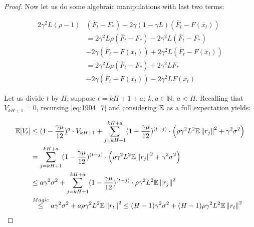 \begin{proof}
    Now let us do some algebraic manipulations with last two terms:

    \begin{align}
        2 \gamma^2 L (\rho - 1) & (\bar{F}_t - F_*)
        - 2\gamma (1-\gamma L) (\bar{F}_t - F(\bar{x}_t)) \\
        &=
        2 \gamma^2 L \rho (\bar{F}_t - F_*)
        - 2 \gamma^2 L (\bar{F}_t - F_*) \\
        &- 2\gamma (\bar{F}_t - F(\bar{x}_t))
        + 2\gamma^2 L (\bar{F}_t - F(\bar{x}_t)) \\
        &=
        2 \gamma^2 L \rho (\bar{F}_t - F_*)
        + 2 \gamma^2 L F_* \\
        &- 2\gamma (\bar{F}_t - F(\bar{x}_t))
        - 2\gamma^2 L F(\bar{x}_t)
    \end{align}

    Let us divide $t$ by $H$, suppose $t = kH + 1 + a; \ k, a \in \mathbb{N}; \ a < H$.
    Recalling that $V_{kH + 1} = 0$, recursing \eqref{eq:1904_7} and considering $\E$ as a full expectation yields:
    
    \begin{align}
        \E [V_{t}]
        &\leq
        (1 - \frac{\gamma \mu}{12})^a  \cdot V_{kH + 1} 
        +
        \summ{j=kH + 1}{kH+a}
        (1 - \frac{\gamma \mu} {12})^{(t-j)}
        \cdot
        \left(
        \rho \gamma^2 L^2 \E \norm{r_j}^2 + \gamma^2 \sigma^2
        \right) \\
        &=
        \summ{j=kH + 1}{kH+a}
        (1 - \frac{\gamma \mu} {12})^{(t-j)}
        \cdot 
        \left(
        \rho \gamma^2 L^2 \E \norm{r_j}^2 + \gamma^2 \sigma^2
        \right) \\
        &\leq
        a \gamma^2 \sigma^2 +
        \summ{j=kH + 1}{kH+a}
        (1 - \frac{\gamma \mu} {12})^{(t-j)}
        \cdot \rho \gamma^2 L^2 \E \norm{r_j}^2 \\
        &\overset{Magic}{\leq}
        a \gamma^2 \sigma^2 + a \rho \gamma^2 L^2 \E \norm{r_t}^2 
        \leq 
        (H-1) \gamma^2 \sigma^2 + (H-1) \rho \gamma^2 L^2 \E \norm{r_t}^2 
    \end{align}
     
\end{proof}



